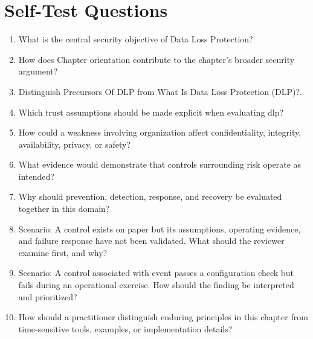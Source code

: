 \documentclass[11pt]{article}
\begin{document}
\section*{Self-Test Questions}
\begin{enumerate}
\item What is the central security objective of Data Loss Protection?
\item How does Chapter orientation contribute to the chapter's broader security argument?
\item Distinguish Precursors Of DLP from What Is Data Loss Protection (DLP)?.
\item Which trust assumptions should be made explicit when evaluating dlp?
\item How could a weakness involving organization affect confidentiality, integrity, availability, privacy, or safety?
\item What evidence would demonstrate that controls surrounding risk operate as intended?
\item Why should prevention, detection, response, and recovery be evaluated together in this domain?
\item Scenario: A control exists on paper but its assumptions, operating evidence, and failure response have not been validated. What should the reviewer examine first, and why?
\item Scenario: A control associated with event passes a configuration check but fails during an operational exercise. How should the finding be interpreted and prioritized?
\item How should a practitioner distinguish enduring principles in this chapter from time-sensitive tools, examples, or implementation details?
\end{enumerate}
\end{document}
